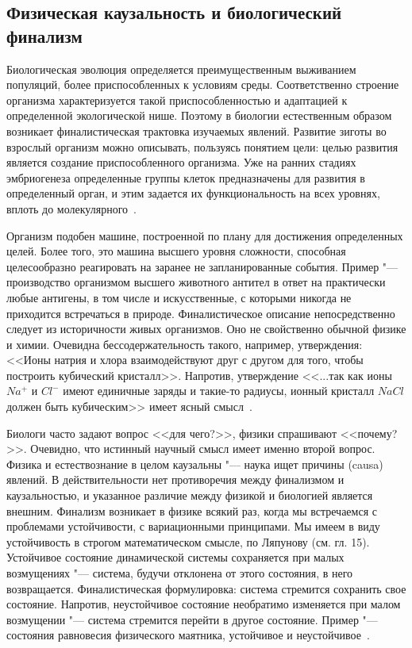 \documentclass[12pt,a4paper,oneside]{book}
\begin{document}
\subsection{Физическая каузальность и биологический финализм}


Биологическая эволюция определяется преимущественным выживанием популяций, более приспособленных к условиям среды. Соответственно строение организма характеризуется такой приспособленностью и адаптацией к определенной экологической нише. Поэтому в биологии естественным образом возникает финалистическая трактовка изучаемых явлений. Развитие зиготы во взрослый организм можно описывать, пользуясь понятием цели: целью развития является создание приспособленного организма. Уже на ранних стадиях эмбриогенеза определенные группы клеток предназначены для развития в определенный орган, и этим задается их функциональность на всех уровнях, вплоть до молекулярного~\cite{Volkenshtejn1988}.

Организм подобен машине, построенной по плану для достижения определенных целей. Более того, это машина высшего уровня сложности, способная целесообразно реагировать на заранее не запланированные события. Пример "--- производство организмом высшего животного антител в ответ на практически любые антигены, в том числе и искусственные, с которыми никогда не приходится встречаться в природе. Финалистическое описание непосредственно следует из историчности живых организмов. Оно не свойственно обычной физике и химии. Очевидна бессодержательность такого, например, утверждения: <<Ионы натрия и хлора взаимодействуют друг с другом для того, чтобы построить кубический кристалл>>. Напротив, утверждение <<...так как ионы $Na^+$ и $Cl^-$ имеют единичные заряды и такие-то радиусы, ионный кристалл $NaCl$ должен быть кубическим>> имеет ясный смысл~\cite{Volkenshtejn1988}.

Биологи часто задают вопрос <<для чего?>>, физики спрашивают <<почему?>>. Очевидно, что истинный научный смысл имеет именно второй вопрос. Физика и естествознание в целом каузальны "--- наука ищет причины (causa) явлений. В действительности нет противоречия между финализмом и каузальностью, и указанное различие между физикой и биологией является внешним. Финализм возникает в физике всякий раз, когда мы встречаемся с проблемами устойчивости, с вариационными принципами. Мы имеем в виду устойчивость в строгом математическом смысле, по Ляпунову (см. гл. 15). Устойчивое состояние динамической системы сохраняется при малых возмущениях "--- система, будучи отклонена от этого состояния, в него возвращается. Финалистическая формулировка: система стремится сохранить свое состояние. Напротив, неустойчивое состояние необратимо изменяется при малом возмущении "--- система стремится перейти в другое состояние. Пример "--- состояния равновесия физического маятника, устойчивое и неустойчивое~\cite{Volkenshtejn1988}.
\end{document}
